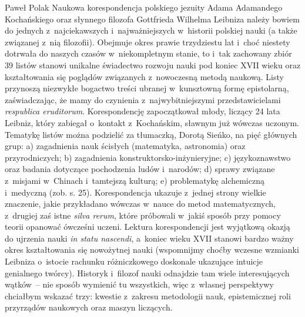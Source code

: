\begin{recplenv}{Paweł Polak}
Naukowa korespondencja polskiego jezuity Adama Adamandego Kochańskiego oraz słynnego filozofa Gottfrieda Wilhelma
Lei\-bniza należy bowiem do jednych z~najciekawszych i~najważniejszych w~historii polskiej nauki (a także związanej z~nią
filozofii). Obejmuje okres prawie trzydziestu lat i~choć niestety dotrwała do naszych czasów w~niekompletnym stanie,
to i~tak zachowany zbiór 39 listów stanowi unikalne świadectwo rozwoju nauki pod koniec XVII wieku oraz kształtowania się
poglądów związanych z~nowoczesną metodą naukową. Listy przynoszą niezwykłe bogactwo treści ubranej w~kunsztowną formę
epistolarną, zaświadczając, że mamy do czynienia z~najwybitniejszymi przedstawicielami \textit{respublica eruditorum}.
Korespondencję zapoczątkował młody, liczący 24 lata Leibniz, który zabiegał o~kontakt z~Kochańskim, sławnym już wówczas
uczonym. Tematykę listów można podzielić za tłumaczką, Dorotą Sieńko, na pięć głównych grup: a) zagadnienia nauk
ścisłych (matematyka, astronomia) oraz przyrodniczych; b) zagadnienia konstruktorsko-inżynieryjne; c) językoznawstwo
oraz badania dotyczące pochodzenia ludów i~narodów; d) sprawy związane z~misjami w~Chinach i~tamtejszą kulturą; e)
problematykę alchemiczną i~medyczną (zob. s. 25). Korespondencja ukazuje z~jednej strony wielkie znaczenie, jakie
przykładano wówczas w~nauce do metod matematycznych, z~drugiej zaś istne \textit{silva rerum}, które próbowali w~jakiś
sposób przy pomocy teorii opanować ówcześni uczeni. Lektura korespondencji jest wyjątkową okazją do ujrzenia nauki
\textit{in statu nascendi}, a~koniec wieku XVII stanowi bardzo ważny okres kształtowania się nowożytnej nauki
(wspomnijmy choćby wczesne wzmianki Leibniza o~istocie rachunku różniczkowego doskonale ukazujące intuicje genialnego
twórcy). Historyk i~filozof nauki odnajdzie tam wiele interesujących wątków~-- nie sposób wymienić tu wszystkich, więc z~własnej
perspektywy chciałbym wskazać trzy: kwestie z~zakresu metodologii nauk, epistemicznej roli przyrządów naukowych
oraz maszyn liczących.

\enlargethispage{.5\baselineskip}


\end{recplenv}
